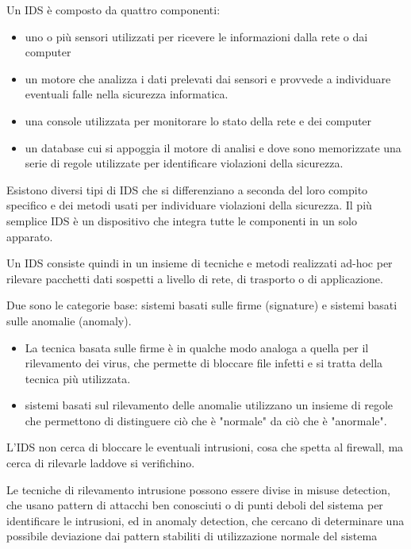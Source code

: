 Un IDS è composto da quattro componenti:
\begin{itemize}
    \item uno o più sensori utilizzati per ricevere le informazioni dalla rete o dai computer
    \item un motore che analizza i dati prelevati dai sensori e provvede a individuare eventuali falle nella sicurezza informatica.
    \item una console utilizzata per monitorare lo stato della rete e dei computer
    \item un database cui si appoggia il motore di analisi e dove sono memorizzate una serie di regole utilizzate per identificare violazioni della sicurezza.
\end{itemize}
Esistono diversi tipi di IDS che si differenziano a seconda del loro compito specifico e dei metodi usati per individuare violazioni della sicurezza. 
Il più semplice IDS è un dispositivo che integra tutte le componenti in un solo apparato.

Un IDS consiste quindi in un insieme di tecniche e metodi realizzati ad-hoc per rilevare pacchetti dati sospetti a livello di rete, di trasporto o di applicazione.

Due sono le categorie base: sistemi basati sulle firme (signature) e sistemi basati sulle anomalie (anomaly).
\begin{itemize}
    \item La tecnica basata sulle firme è in qualche modo analoga a quella per il rilevamento dei virus, che permette di bloccare file infetti e si tratta della tecnica più utilizzata. 
    \item  sistemi basati sul rilevamento delle anomalie utilizzano un insieme di regole che permettono di distinguere ciò che è "normale" da ciò che è "anormale".
\end{itemize}
L'IDS non cerca di bloccare le eventuali intrusioni, cosa che spetta al firewall, ma cerca di rilevarle laddove si verifichino.


Le tecniche di rilevamento intrusione possono essere divise in misuse detection, 
che usano pattern di attacchi ben conosciuti o di punti deboli del sistema per identificare le intrusioni, 
ed in anomaly detection, che cercano di determinare una possibile deviazione dai pattern stabiliti di utilizzazione normale del sistema


